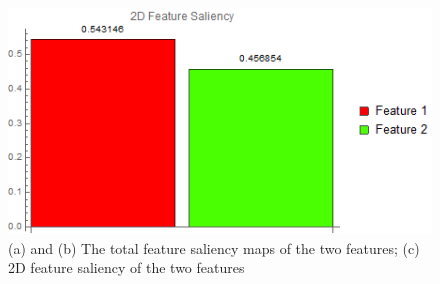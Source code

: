 \begin{figure}
\begin{minipage}{.33\textwidth}
	\end{minipage}~
	\begin{minipage}{.33\textwidth}
		\includegraphics[width=1\linewidth]{images/engine_naive_2DFS}
	\end{minipage}
	\caption{(a) and (b) The total feature saliency maps of the two features; (c) 2D feature saliency of the two features}
	\label{fig:engine_naive_saliencemap_features}
\end{figure}
